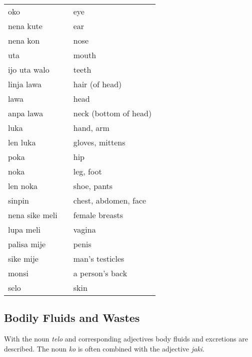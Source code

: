\begin{supertabular}{p{5,5cm}|ll}
    oko            &  & eye                   \\
    nena kute      &  & ear                   \\
    nena kon       &  & nose                  \\
    uta            &  & mouth                 \\
    ijo uta walo   &  & teeth                 \\
    linja lawa     &  & hair (of head)        \\
    lawa           &  & head                  \\
    anpa lawa      &  & neck (bottom of head) \\
    luka           &  & hand, arm             \\
    len luka       &  & gloves, mittens       \\
    poka           &  & hip                   \\
    noka           &  & leg, foot             \\
    len noka       &  & shoe, pants           \\
    sinpin         &  & chest, abdomen, face  \\
    nena sike meli &  & female breasts        \\
    lupa meli      &  & vagina                \\
    palisa mije    &  & penis                 \\
    sike mije      &  & man's testicles       \\
    monsi          &  & a person's back       \\
    selo           &  & skin                  \\
\end{supertabular}
%
%
%
\subsection*{Bodily Fluids and Wastes}
%
%
With the noun \textit{telo} and corresponding adjectives body fluids and excretions are described.
The noun \textit{ko} is often combined with the adjective \textit{jaki}.


